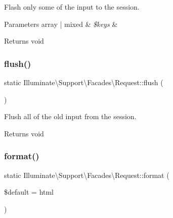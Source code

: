 Flash only some of the input to the session.


\begin{DoxyParams}[1]{Parameters}
array | mixed & {\em \$keys} & \\
\hline
\end{DoxyParams}
\begin{DoxyReturn}{Returns}
void 
\end{DoxyReturn}
\mbox{\label{class_illuminate_1_1_support_1_1_facades_1_1_request_a95af77259531744a727e567b89f63377}} 
\subsubsection{\texorpdfstring{flush()}{flush()}}
{\footnotesize\ttfamily static Illuminate\textbackslash{}\+Support\textbackslash{}\+Facades\textbackslash{}\+Request\+::flush (\begin{DoxyParamCaption}{ }\end{DoxyParamCaption})\hspace{0.3cm}{\ttfamily [static]}}

Flush all of the old input from the session.

\begin{DoxyReturn}{Returns}
void 
\end{DoxyReturn}
\mbox{\label{class_illuminate_1_1_support_1_1_facades_1_1_request_ac091887300694c2d2f8630bb15adc897}} 
\subsubsection{\texorpdfstring{format()}{format()}}
{\footnotesize\ttfamily static Illuminate\textbackslash{}\+Support\textbackslash{}\+Facades\textbackslash{}\+Request\+::format (\begin{DoxyParamCaption}\item[{}]{\$default = {\ttfamily \textquotesingle{}html\textquotesingle{}} }\end{DoxyParamCaption})\hspace{0.3cm}{\ttfamily [static]}}

